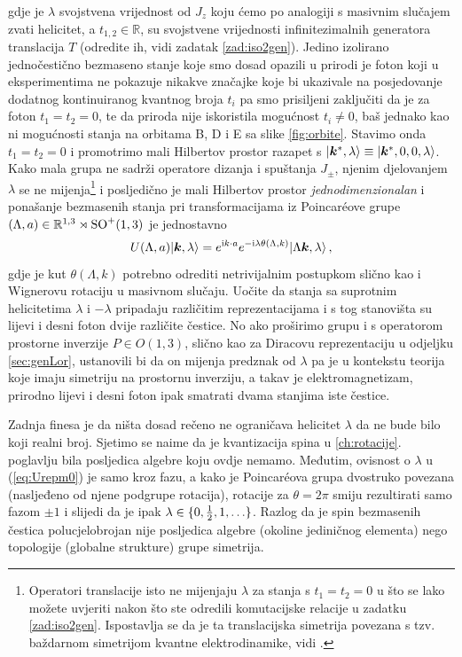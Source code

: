 gdje je $\lambda$ svojstvena vrijednost od $J_z$ koju ćemo po analogiji
s masivnim slučajem zvati helicitet, a $t_{1,2}\in\mathbb{R}$,
su svojstvene
vrijednosti infinitezimalnih generatora translacija $T$ (odredite ih, vidi
zadatak \ref{zad:iso2gen}).
Jedino izolirano jednočestično bezmaseno stanje koje smo dosad opazili
u prirodi je foton koji u eksperimentima ne pokazuje nikakve značajke
koje bi ukazivale na posjedovanje dodatnog kontinuiranog kvantnog broja
$t_i$ pa smo prisiljeni zaključiti da je za foton $t_1=t_2=0$,
te da priroda nije iskoristila mogućnost $t_i \neq 0$, baš jednako kao ni
mogućnosti stanja na orbitama B, D i E sa slike \ref{fig:orbite}.
Stavimo onda $t_1=t_2=0$ i promotrimo mali Hilbertov prostor
razapet s $\ket{\vec{k}^{*}, \lambda} \equiv \ket{\vec{k}^{*}, 0, 0, \lambda}$.
Kako mala grupa ne sadrži
operatore dizanja i spuštanja $J_{\pm}$, njenim djelovanjem $\lambda$
se ne mijenja\footnote{Operatori translacije isto ne mijenjaju $\lambda$
    za stanja s $t_1=t_2=0$ u što se lako možete uvjeriti nakon što
ste odredili komutacijske relacije u zadatku \ref{zad:iso2gen}.
Ispostavlja se da je ta translacijska simetrija povezana s tzv.
baždarnom simetrijom kvantne elektrodinamike, vidi \cite{Weinberg:1995mt}.}
i posljedično je mali Hilbertov prostor \emph{jednodimenzionalan} i
ponašanje bezmasenih stanja pri
transformacijama iz Poincar\'{e}ove grupe 
$(\Lambda, a) \in \mathbb{R}^{1,3}\rtimes\mathrm{SO}^{+}(1,3)$ je jednostavno
\begin{equation}
    U(\Lambda, a) \ket{\vec{k}, \lambda} = e^{\rmi k\cdot a}
    e^{-\rmi \lambda \theta(\Lambda, k)} \ket{\Lambda\vec{k}, \lambda} \,,
    \label{eq:Urepm0}
\end{equation}
gdje je kut $\theta(\Lambda, k)$ potrebno odrediti netrivijalnim postupkom slično kao
i Wignerovu rotaciju u masivnom slučaju.
Uočite da stanja sa suprotnim helicitetima $\lambda$ i $-\lambda$ pripadaju
različitim reprezentacijama
i s tog stanovišta su lijevi i desni foton dvije različite čestice.
No ako proširimo grupu i s operatorom prostorne inverzije $P\in O(1,3)$, slično kao za Diracovu
reprezentaciju u odjeljku \ref{sec:genLor}, ustanovili bi da
on mijenja predznak od $\lambda$ pa je u kontekstu teorija koje
imaju simetriju na prostornu inverziju, a takav je elektromagnetizam,
prirodno lijevi i desni foton ipak smatrati dvama stanjima iste čestice.

Zadnja finesa je da ništa dosad rečeno ne ograničava helicitet $\lambda$
da ne bude bilo koji realni broj. Sjetimo se naime da je kvantizacija
spina u \ref{ch:rotacije}. poglavlju bila posljedica  algebre
koju ovdje nemamo. Međutim, ovisnost o $\lambda$
u (\ref{eq:Urepm0}) je samo kroz fazu, a kako je Poincar\'{e}ova grupa
dvostruko povezana (nasljeđeno od njene  podgrupe rotacija),
rotacije za $\theta=2\pi$ smiju rezultirati samo fazom $\pm 1$ i
slijedi da je ipak $\lambda \in \{0, \frac{1}{2}, 1, \ldots\}$. Razlog
da je spin bezmasenih čestica polucjelobrojan nije posljedica
algebre (okoline jediničnog elementa) nego topologije (globalne strukture)
grupe simetrija.





